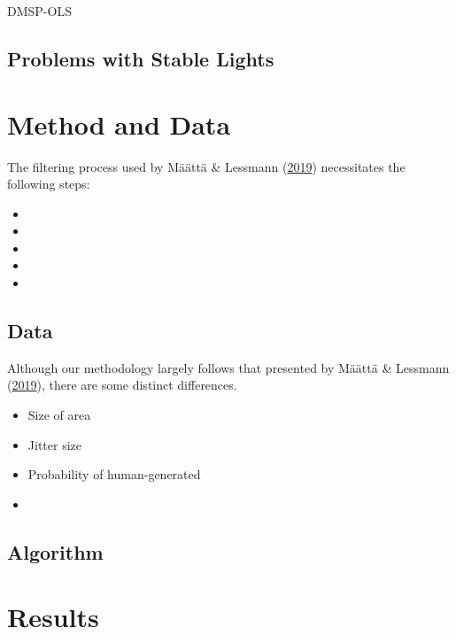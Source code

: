 \documentclass[11pt,preprint, authoryear]{elsarticle}
\numberwithin{equation}{section}
\numberwithin{figure}{section}
\numberwithin{table}{section}
\def\tightlist{} %
\begin{document}
DMSP-OLS

\hypertarget{problems-with-stable-lights}{%
\subsection{Problems with Stable
Lights}\label{problems-with-stable-lights}}

\hypertarget{method-and-data}{%
\section{\texorpdfstring{Method and Data
\label{Methodology}}{Method and Data }}\label{method-and-data}}

The filtering process used by Määttä \& Lessmann
(\protect\hyperlink{ref-maatta}{2019}) necessitates the following steps:

\begin{itemize}
\tightlist
\item
\item
\item
\item
\item
\end{itemize}

\hypertarget{data}{%
\subsection{Data}\label{data}}

Although our methodology largely follows that presented by Määttä \&
Lessmann (\protect\hyperlink{ref-maatta}{2019}), there are some distinct
differences.

\begin{itemize}
\tightlist
\item
  Size of area
\item
  Jitter size
\item
  Probability of human-generated
\item
\end{itemize}

\hypertarget{algorithm}{%
\subsection{Algorithm}\label{algorithm}}

\hypertarget{results}{%
\section{\texorpdfstring{Results
\label{Results}}{Results }}\label{results}}
\end{document}
